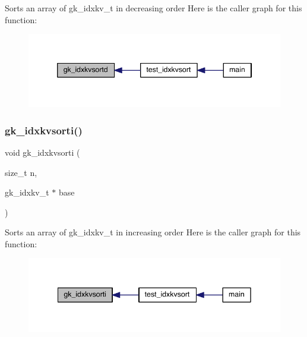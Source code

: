 Sorts an array of gk\+\_\+idxkv\+\_\+t in decreasing order Here is the caller graph for this function\+:\nopagebreak
\begin{figure}[H]
\begin{center}
\leavevmode
\includegraphics[width=346pt]{a00140_adf1ba87bf59cbb6c93372843224adbc7_icgraph}
\end{center}
\end{figure}
\mbox{\label{a00140_af0fa267ef67c10f98065915c6033f683}} 
\subsubsection{\texorpdfstring{gk\+\_\+idxkvsorti()}{gk\_idxkvsorti()}}
{\footnotesize\ttfamily void gk\+\_\+idxkvsorti (\begin{DoxyParamCaption}\item[{size\+\_\+t}]{n,  }\item[{gk\+\_\+idxkv\+\_\+t $\ast$}]{base }\end{DoxyParamCaption})}

Sorts an array of gk\+\_\+idxkv\+\_\+t in increasing order Here is the caller graph for this function\+:\nopagebreak
\begin{figure}[H]
\begin{center}
\leavevmode
\includegraphics[width=342pt]{a00140_af0fa267ef67c10f98065915c6033f683_icgraph}
\end{center}
\end{figure}
\mbox{\label{a00140_a851c55670d9c95d34c588eb086626e6d}} 
